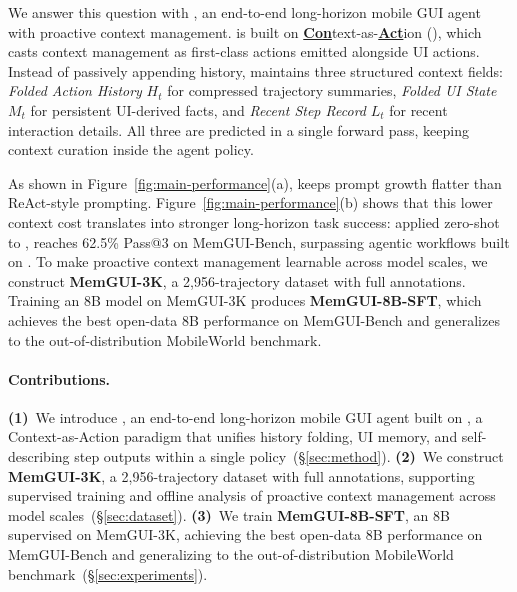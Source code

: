 
We answer this question with \textbf{\ourmethod}, an end-to-end long-horizon mobile GUI agent with proactive context management. \ourmethod is built on \textbf{\underline{Con}}text-as-\textbf{\underline{Act}}ion (\textbf{\conact}), which casts context management as first-class actions emitted alongside UI actions. Instead of passively appending history, \conact maintains three structured context fields: \textcolor{histcolor}{\emph{Folded Action History}} \textcolor{histcolor}{$H_t$} for compressed trajectory summaries, \textcolor{memstatecolor}{\emph{Folded UI State}} \textcolor{memstatecolor}{$M_t$} for persistent UI-derived facts, and \textcolor{recentcolor}{\emph{Recent Step Record}} \textcolor{recentcolor}{$L_t$} for recent interaction details. All three are predicted in a single forward pass, keeping context curation inside the agent policy.

As shown in Figure~\ref{fig:main-performance}(a), \conact keeps prompt growth flatter than ReAct-style prompting. Figure~\ref{fig:main-performance}(b) shows that this lower context cost translates into stronger long-horizon task success: applied zero-shot to , \ourmethod reaches 62.5\% Pass@3 on MemGUI-Bench, surpassing agentic workflows built on . To make proactive context management learnable across model scales, we construct \textbf{MemGUI-3K}, a 2{,}956-trajectory dataset with full \conact annotations. Training an 8B model on MemGUI-3K produces \textbf{MemGUI-8B-SFT}, which achieves the best open-data 8B performance on MemGUI-Bench and generalizes to the out-of-distribution MobileWorld benchmark.

\paragraph{Contributions.}
\textbf{(1)}~We introduce \textbf{\ourmethod}, an end-to-end long-horizon mobile GUI agent built on \conact, a Context-as-Action paradigm that unifies history folding, UI memory, and self-describing step outputs within a single policy~(\S\ref{sec:method}).
\textbf{(2)}~We construct \textbf{MemGUI-3K}, a 2{,}956-trajectory dataset with full \conact annotations, supporting supervised training and offline analysis of proactive context management across model scales~(\S\ref{sec:dataset}).
\textbf{(3)}~We train \textbf{MemGUI-8B-SFT}, an 8B \ourmethod supervised on MemGUI-3K, achieving the best open-data 8B performance on MemGUI-Bench and generalizing to the out-of-distribution MobileWorld benchmark~(\S\ref{sec:experiments}).
